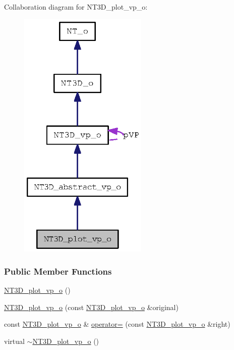 Collaboration diagram for NT3D\_\-plot\_\-vp\_\-o:
\nopagebreak
\begin{figure}[H]
\begin{center}
\leavevmode
\includegraphics[width=174pt]{class_n_t3_d__plot__vp__o__coll__graph}
\end{center}
\end{figure}
\subsubsection*{Public Member Functions}
\begin{DoxyCompactItemize}
\item 
\hyperlink{class_n_t3_d__plot__vp__o_a95dea1e437a6e3d0ced9f48b1ccb06e6}{NT3D\_\-plot\_\-vp\_\-o} ()
\item 
\hyperlink{class_n_t3_d__plot__vp__o_a5b7730bc792c38e806f735628e74300e}{NT3D\_\-plot\_\-vp\_\-o} (const \hyperlink{class_n_t3_d__plot__vp__o}{NT3D\_\-plot\_\-vp\_\-o} \&original)
\item 
const \hyperlink{class_n_t3_d__plot__vp__o}{NT3D\_\-plot\_\-vp\_\-o} \& \hyperlink{class_n_t3_d__plot__vp__o_ad30a8364501f1b76d8cb184f6481e91e}{operator=} (const \hyperlink{class_n_t3_d__plot__vp__o}{NT3D\_\-plot\_\-vp\_\-o} \&right)
\item 
virtual \hyperlink{class_n_t3_d__plot__vp__o_a1818fbcddbff359768de5808fd1704aa}{$\sim$NT3D\_\-plot\_\-vp\_\-o} ()
\end{DoxyCompactItemize}



